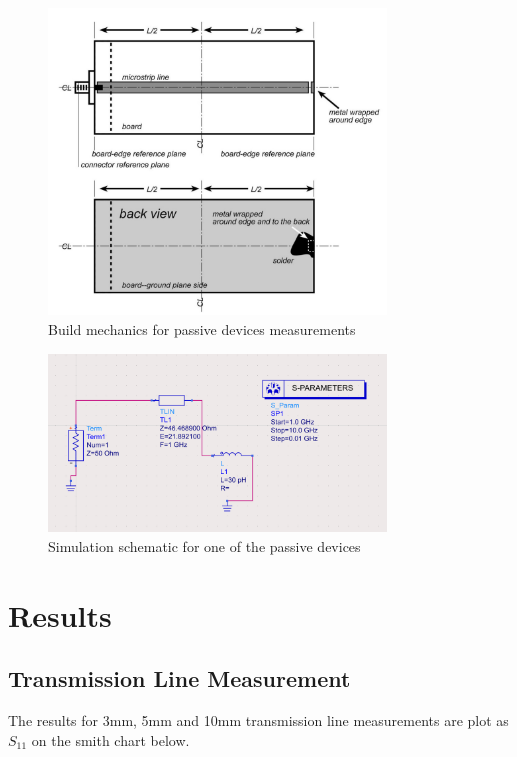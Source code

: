 \documentclass{article}
\begin{document}
\begin{figure}[H]
    \centering
    \includegraphics[width = 0.8\textwidth]{figures/Passive.jpg}
    \caption{Build mechanics for passive devices measurements}
\end{figure}

\begin{figure}[H]
    \centering
    \includegraphics[width = 0.8\textwidth]{figures/schematic2.PNG}
    \caption{Simulation schematic for one of the passive devices}
    \label{fig:my_label}
\end{figure}












\section{Results}
\subsection{Transmission Line Measurement}
The results for 3mm, 5mm and 10mm transmission line measurements are plot as $S_{11}$ on the smith chart below.  
\end{document}
